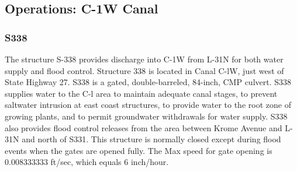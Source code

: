 %
%
%



\clearpage
\subsection{Operations: C-1W Canal}

\subsubsection{S338}
The structure S-338 provides discharge into C-1W from L-31N for both water supply and flood control.
Structure 338 is located in Canal C-lW, just west of State Highway 27. S338 is a gated, double-barreled, 84-inch, CMP culvert. S338 supplies water to the C-l area to maintain adequate canal stages, to prevent saltwater intrusion at east coast structures, to provide water to the root zone of growing plants, and to permit groundwater withdrawals for water supply. S338 also provides flood control releases from the area between Krome Avenue and L-31N and north of S331. This structure is normally closed except during flood events when the gates are opened fully. The Max speed for gate opening is 0.008333333 ft/sec, which equals 6 inch/hour.


